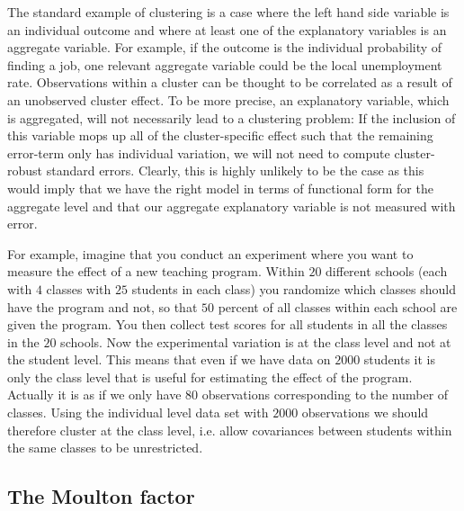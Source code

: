 \documentclass{article}
\begin{document}
The standard example of clustering is a case where the left hand side
variable is an individual outcome and where at least one of the explanatory
variables is an aggregate variable. For example, if the outcome is the
individual probability of finding a job, one relevant aggregate variable
could be the local unemployment rate. Observations within a cluster can be
thought to be correlated as a result of an unobserved cluster effect. To be
more precise, an explanatory variable, which is aggregated, will not
necessarily lead to a clustering problem: If the inclusion of this variable
mops up all of the cluster-specific effect such that the remaining
error-term only has individual variation, we will not need to compute
cluster-robust standard errors. Clearly, this is highly unlikely to be the
case as this would imply that we have the right model in terms of functional
form for the aggregate level and that our aggregate explanatory variable is
not measured with error.

For example, imagine that you conduct an experiment where you want to
measure the effect of a new teaching program. Within $20$ different schools
(each with $4$ classes with $25$ students in each class) you randomize which
classes should have the program and not, so that $50$ percent of all classes
within each school are given the program. You then collect test scores for
all students in all the classes in the $20$ schools. Now the experimental
variation is at the class level and not at the student level. This means
that even if we have data on $2000$ students it is only the class level that
is useful for estimating the effect of the program. Actually it is as if we
only have $80$ observations corresponding to the number of classes. Using
the individual level data set with $2000$ observations we should therefore
cluster at the class level, i.e. allow covariances between students within
the same classes to be unrestricted.

\subsection{The Moulton factor}
\end{document}

